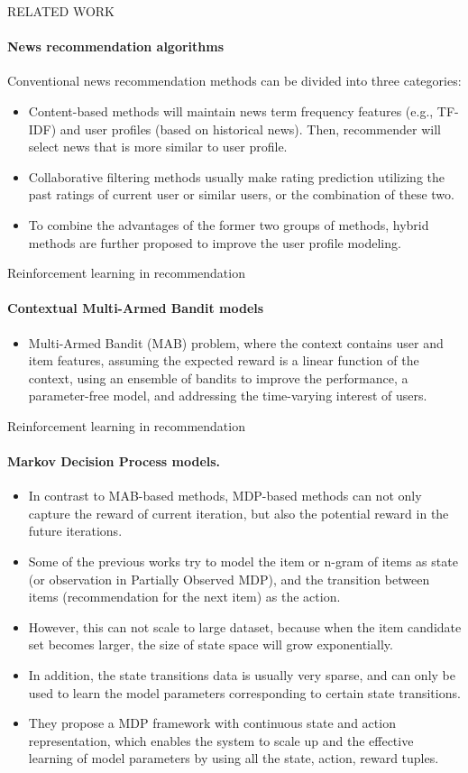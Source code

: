 \begin{frame}{RELATED WORK}
  \framesubtitle{News recommendation algorithms}
  Conventional news recommendation methods can be divided into three categories:
  \begin{itemize}
      \item Content-based methods will maintain news term frequency features (e.g., TF-IDF) and user profiles (based on historical news). Then, recommender will select news that is more similar to user profile.
      \item Collaborative filtering methods usually make rating prediction utilizing the past ratings of current user or similar users, or the combination of these two.
      \item To combine the advantages of the former two groups of methods, hybrid methods are further proposed to improve the user profile modeling.
  \end{itemize}
 
\end{frame}

\begin{frame}{Reinforcement learning in recommendation}
  \framesubtitle{Contextual Multi-Armed Bandit models}
 
  \begin{itemize}
      \item Multi-Armed Bandit (MAB) problem, where the context contains user and item features, assuming the expected reward is a linear function of the context, using an ensemble of bandits to improve the performance, a parameter-free model, and addressing the time-varying interest of users.
  \end{itemize}
\end{frame}


\begin{frame}{Reinforcement learning in recommendation}
  \framesubtitle{Markov Decision Process models.}
 
  \begin{itemize}
      \item In contrast to MAB-based methods, MDP-based methods can not only capture the reward of current iteration, but also the potential reward in the future iterations.
      \item Some of the previous works try to model the item or n-gram of items as state (or observation in Partially Observed MDP), and the transition between items (recommendation for the next item) as the action.
      \item However, this can not scale to large dataset, because when the item candidate set becomes larger, the size of state space will grow exponentially.
      \item In addition, the state transitions data is usually very sparse, and can only be used to learn the model parameters corresponding to certain state transitions.
      \item They propose a MDP framework with continuous state and action representation, which enables the system to scale up and the effective learning of model parameters by using all the state, action, reward tuples.
  \end{itemize}
\end{frame}
 
